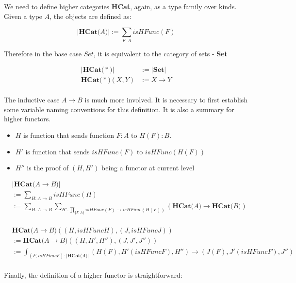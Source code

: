 We need to define higher categories \textbf{HCat}, again, as a type family over kinds. Given a type $A$, the objects are defined as:

\[ \lvert\textbf{HCat(} A \textbf{)}\rvert := \sum_{F : A} isHFunc(F) \]

Therefore in the base case $Set$, it is equivalent to the category of sets - \textbf{Set}

\begin{align*}
\lvert\textbf{HCat(} * \textbf{)}\rvert &:= \lvert\textbf{Set}\rvert \\
\textbf{HCat(} * \textbf{)} (X , Y) &:= X \to Y \\
\end{align*}

The inductive case $A \to B$ is much more involved. It is necessary to first establish some variable naming conventions for this definition. It is also a summary for higher functors.

\begin{itemize}
  \item{$H$ is function that sends function $F : A$ to $H(F) : B$}.
  \item{$H'$ is function that sends $isHFunc(F)$ to $isHFunc(H(F))$}
  \item{$H''$ is the proof of $(H , H')$ being a functor at current level}
\end{itemize}

\begin{align*}
& \lvert\textbf{HCat(} A \to B \textbf{)}\rvert \\
&:= \sum_{H : A \to B} isHFunc(H) \\
&:= \sum_{H : A \to B} \sum_{H' : \prod_{\{F : A\}} isHFunc(F) \to isHFunc(H(F))} (\textbf{HCat(} A \textbf{)} \to \textbf{HCat(} B \textbf{)}) \\
\end{align*}

\begin{align*}
& \textbf{HCat(} A \to B \textbf{)} ((H , isHFuncH) , (J, isHFuncJ)) \\
&:= \textbf{HCat(} A \to B \textbf{)} ((H , H' , H'') , (J, J' , J'')) \\
&:= \int_{(F , isHFuncF) : \lvert\textbf{HCat(} A \textbf{)}\rvert} (H(F) , H'(isHFuncF), H'') \to (J(F) , J'(isHFuncF), J'') \\
\end{align*}

Finally, the definition of a higher functor is straightforward:

